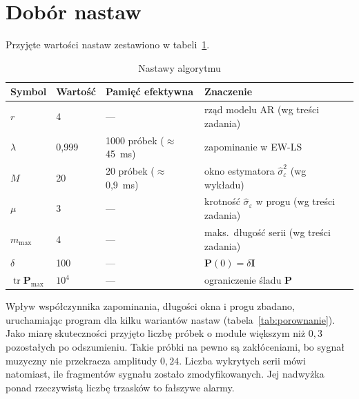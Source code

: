 \documentclass[11pt,a4paper]{article}
\begin{document}
\section{Dobór nastaw}

Przyjęte wartości nastaw zestawiono w tabeli~\ref{tab:nastawy}.

\begin{table}[H]
  \centering
  \caption{Nastawy algorytmu}
  \label{tab:nastawy}
  \begin{tabular}{llll}
    \toprule
    Symbol & Wartość & Pamięć efektywna & Znaczenie \\
    \midrule
    $r$             & 4      & ---                          & rząd modelu AR (wg treści zadania) \\
    $\lambda$       & 0,999  & 1000 próbek ($\approx$45~ms) & zapominanie w EW-LS \\
    $M$             & 20     & 20 próbek ($\approx$0,9~ms)  & okno estymatora $\hat\sigma^2_\varepsilon$ (wg wykładu) \\
    $\mu$           & 3      & ---                          & krotność $\hat\sigma_\varepsilon$ w progu (wg treści zadania) \\
    $m_{\max}$      & 4      & ---                          & maks.\ długość serii (wg treści zadania) \\
    $\delta$        & 100    & ---                          & $\mathbf{P}(0) = \delta\mathbf{I}$ \\
    $\operatorname{tr}\mathbf{P}_{\max}$ & $10^4$ & ---     & ograniczenie śladu $\mathbf{P}$ \\
    \bottomrule
  \end{tabular}
\end{table}

Wpływ współczynnika zapominania, długości okna i progu zbadano, uruchamiając
program dla kilku wariantów nastaw (tabela~\ref{tab:porownanie}). Jako miarę
skuteczności przyjęto liczbę próbek o module większym niż $0{,}3$
pozostałych po odszumieniu. Takie próbki na pewno są zakłóceniami, bo
sygnał muzyczny nie przekracza amplitudy $0{,}24$. Liczba wykrytych serii
mówi natomiast, ile fragmentów sygnału zostało zmodyfikowanych. Jej
nadwyżka ponad rzeczywistą liczbę trzasków to fałszywe alarmy.
\end{document}
